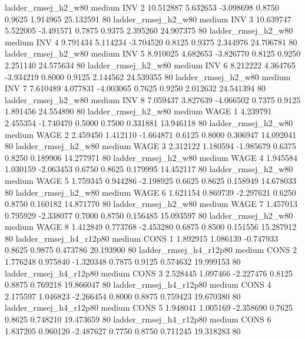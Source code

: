    ladder_rmsej_h2_w80     medium      INV                 2 10.512887 5.632653 -3.098698 0.8750 0.9625  1.914965   25.132591 80
   ladder_rmsej_h2_w80     medium      INV                 3 10.639747 5.522005 -3.491571 0.7875 0.9375  2.395260   24.907375 80
   ladder_rmsej_h2_w80     medium      INV                 4  9.791434 5.114234 -3.704520 0.8125 0.9375  2.344976   24.706781 80
   ladder_rmsej_h2_w80     medium      INV                 5  8.910025 4.682653 -3.826770 0.8125 0.9250  2.251140   24.575634 80
   ladder_rmsej_h2_w80     medium      INV                 6  8.212222 4.364765 -3.934219 0.8000 0.9125  2.144562   24.539355 80
   ladder_rmsej_h2_w80     medium      INV                 7  7.610489 4.077831 -4.003065 0.7625 0.9250  2.012632   24.541394 80
   ladder_rmsej_h2_w80     medium      INV                 8  7.059437 3.827639 -4.066502 0.7375 0.9125  1.891456   24.554890 80
   ladder_rmsej_h2_w80     medium     WAGE                 1  4.239791 2.455354 -1.740470 0.5000 0.7500  0.331881   13.946118 80
   ladder_rmsej_h2_w80     medium     WAGE                 2  2.459450 1.412110 -1.664871 0.6125 0.8000  0.306947   14.092041 80
   ladder_rmsej_h2_w80     medium     WAGE                 3  2.312122 1.180594 -1.985679 0.6375 0.8250  0.189906   14.277971 80
   ladder_rmsej_h2_w80     medium     WAGE                 4  1.945584 1.030159 -2.063453 0.6750 0.8625  0.179995   14.452117 80
   ladder_rmsej_h2_w80     medium     WAGE                 5  1.759345 0.944286 -2.198925 0.6625 0.8625  0.158949   14.678033 80
   ladder_rmsej_h2_w80     medium     WAGE                 6  1.621154 0.869739 -2.297621 0.6250 0.8750  0.160182   14.871770 80
   ladder_rmsej_h2_w80     medium     WAGE                 7  1.457013 0.795929 -2.338077 0.7000 0.8750  0.156485   15.093597 80
   ladder_rmsej_h2_w80     medium     WAGE                 8  1.412849 0.773768 -2.453280 0.6875 0.8500  0.151556   15.287912 80
ladder_rmsej_h4_r12p80     medium     CONS                 1  1.892915 1.086139 -0.747933 0.8625 0.9875  0.473786   20.193900 80
ladder_rmsej_h4_r12p80     medium     CONS                 2  1.776248 0.975840 -1.320348 0.7875 0.9125  0.574632   19.999153 80
ladder_rmsej_h4_r12p80     medium     CONS                 3  2.528445 1.097466 -2.227476 0.8125 0.8875  0.769218   19.866047 80
ladder_rmsej_h4_r12p80     medium     CONS                 4  2.175597 1.046823 -2.266454 0.8000 0.8875  0.759423   19.670380 80
ladder_rmsej_h4_r12p80     medium     CONS                 5  1.948041 1.005169 -2.358690 0.7625 0.8625  0.748210   19.473659 80
ladder_rmsej_h4_r12p80     medium     CONS                 6  1.837205 0.960120 -2.487627 0.7750 0.8750  0.711245   19.318283 80
